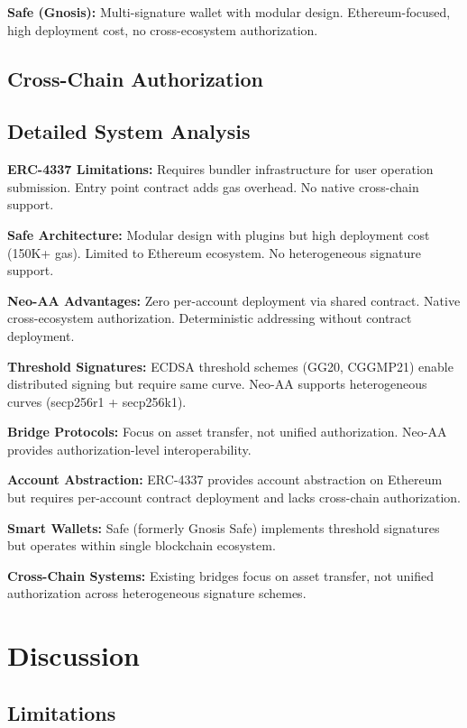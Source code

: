 \documentclass[10pt,twocolumn]{article}
\begin{document}
\textbf{Safe (Gnosis):} Multi-signature wallet with modular design. Ethereum-focused, high deployment cost, no cross-ecosystem authorization.

\subsection{Cross-Chain Authorization}

\subsection{Detailed System Analysis}

\textbf{ERC-4337 Limitations:} Requires bundler infrastructure for user operation submission. Entry point contract adds gas overhead. No native cross-chain support.

\textbf{Safe Architecture:} Modular design with plugins but high deployment cost (150K+ gas). Limited to Ethereum ecosystem. No heterogeneous signature support.

\textbf{Neo-AA Advantages:} Zero per-account deployment via shared contract. Native cross-ecosystem authorization. Deterministic addressing without contract deployment.


\textbf{Threshold Signatures:} ECDSA threshold schemes (GG20, CGGMP21) enable distributed signing but require same curve. Neo-AA supports heterogeneous curves (secp256r1 + secp256k1).

\textbf{Bridge Protocols:} Focus on asset transfer, not unified authorization. Neo-AA provides authorization-level interoperability.


\textbf{Account Abstraction:} ERC-4337 provides account abstraction on Ethereum but requires per-account contract deployment and lacks cross-chain authorization.

\textbf{Smart Wallets:} Safe (formerly Gnosis Safe) implements threshold signatures but operates within single blockchain ecosystem.

\textbf{Cross-Chain Systems:} Existing bridges focus on asset transfer, not unified authorization across heterogeneous signature schemes.


\section{Discussion}

\subsection{Limitations}
\end{document}
